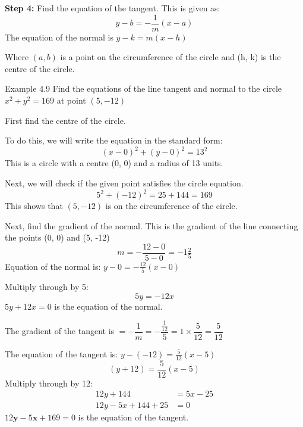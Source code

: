 \textbf{Step 4:} Find the equation of the tangent. This is given as:
\[ y - b = -\frac{1}{m}(x - a) \]
The equation of the normal is $y - k = m(x - h)$

Where $(a, b)$ is a point on the circumference of the circle and (h, k) is the centre
of the circle.

\begin{example}{Example 4.9}
Find the equations of the line tangent and normal to the circle $x^2 + y^2 = 169$ at
point $(5, -12)$

\solution
First find the centre of the circle.

To do this, we will write the equation in the standard form:
\[ (x - 0)^2 + (y - 0)^2 = 13^2 \]
This is a circle with a centre (0, 0) and a radius of 13 units.

Next, we will check if the given point satisfies the circle equation.
\[ 5^2 + (-12)^2 = 25 + 144 = 169 \]
This shows that $(5, -12)$ is on the circumference of the circle.

Next, find the gradient of the normal. This is the gradient of the line connecting
the points (0, 0) and (5, -12)
\[ m = -\frac{12 - 0}{5 - 0} = -1\tfrac{2}{5} \]
Equation of the normal is: $y - 0 = -\frac{12}{5}(x - 0)$

Multiply through by 5:
\[ 5y = -12x \]
$5y + 12x = 0$ is the equation of the normal.

The gradient of the tangent is $= -\dfrac{1}{m} = -\dfrac{\frac{1}{12}}{5} = 1 \times \dfrac{5}{12} = \dfrac{5}{12}$

The equation of the tangent is: $y - (-12) = \frac{5}{12}(x - 5)$
\[ (y + 12) = \frac{5}{12}(x - 5) \]
Multiply through by 12:
\begin{align*}
12y + 144 &= 5x - 25 \\
12y - 5x + 144 + 25 &= 0
\end{align*}
$12\boldsymbol{y} - 5\boldsymbol{x} + 169 = 0$ is the equation of the tangent.
\end{example}


